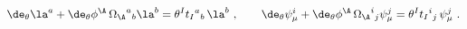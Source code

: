 \begin{equation}
  \de_\theta \la^a + \de_\theta \phi^\A\, {\Omega_\A}^a{}_b \la^b =
  \theta^I {t_I}^a{}_b\, \la^b\ ,\qquad \de_\theta \psi_\mu^i +
  \de_\theta \phi^\A\, {\Omega_\A}^i{}_j \psi_\mu^j = \theta^I {t_I}^i
  {}_j\, \psi_\mu^j\ .
 \end{equation}

